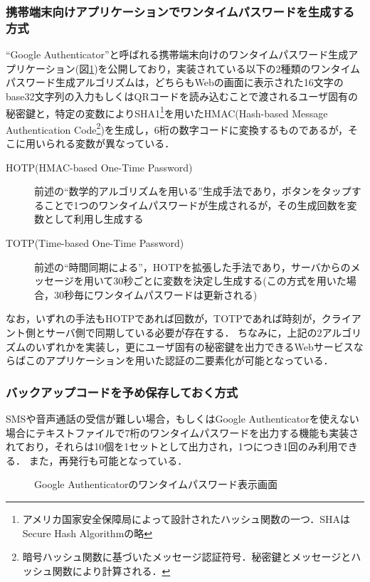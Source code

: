 \subsubsection{携帯端末向けアプリケーションでワンタイムパスワードを生成する方式}
``Google Authenticator''\cite{googleAuthenticatorCode}と呼ばれる携帯端末向けのワンタイムパスワード生成アプリケーション(図\ref{fig:googleAuthenticator})を公開しており，実装されている以下の2種類のワンタイムパスワード生成アルゴリズムは，どちらもWebの画面に表示された16文字のbase32文字列の入力もしくはQRコードを読み込むことで渡されるユーザ固有の秘密鍵と，特定の変数によりSHA1\footnote{アメリカ国家安全保障局によって設計されたハッシュ関数の一つ．SHAはSecure Hash Algorithmの略}を用いたHMAC(Hash-based Message Authentication Code\footnote{暗号ハッシュ関数に基づいたメッセージ認証符号．秘密鍵とメッセージとハッシュ関数により計算される．})を生成し，6桁の数字コードに変換するものであるが，そこに用いられる変数が異なっている．
\begin{description}
  \item[HOTP(HMAC-based One-Time Password)] 前述の``数学的アルゴリズムを用いる''生成手法であり，ボタンをタップすることで1つのワンタイムパスワードが生成されるが，その生成回数を変数として利用し生成する\cite{rfc4226}
  \item[TOTP(Time-based One-Time Password)] 前述の``時間同期による''，HOTPを拡張した手法であり，サーバからのメッセージを用いて30秒ごとに変数を決定し生成する(この方式を用いた場合，30秒毎にワンタイムパスワードは更新される)\cite{rfc6238}
\end{description}
なお，いずれの手法もHOTPであれば回数が，TOTPであれば時刻が，クライアント側とサーバ側で同期している必要が存在する．
ちなみに，上記の2アルゴリズムのいずれかを実装し，更にユーザ固有の秘密鍵を出力できるWebサービスならばこのアプリケーションを用いた認証の二要素化が可能となっている．

\subsubsection{バックアップコードを予め保存しておく方式}
SMSや音声通話の受信が難しい場合，もしくはGoogle Authenticatorを使えない場合にテキストファイルで7桁のワンタイムパスワードを出力する機能も実装されており，それらは10個を1セットとして出力され，1つにつき1回のみ利用できる．
また，再発行も可能となっている．

\begin{figure}[ht]
  \begin{center}
  \end{center}
  \caption{Google Authenticatorのワンタイムパスワード表示画面}
  \label{fig:googleAuthenticator}
\end{figure}

